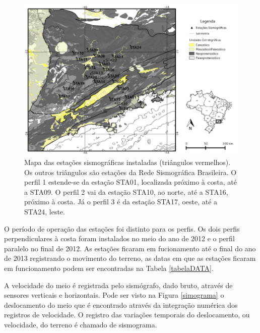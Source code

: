 \begin{figure}[!ht]
\centering
\includegraphics[scale=0.5]{Figs/mapa_das_estacoes_simosgraficas_instaladas.png}
\caption[Mapa das estações sismográficas instaladas]{Mapa das estações sismográficas instaladas (triângulos vermelhos). Os outros triângulos são estações da Rede Sismográfica Brasileira. O perfil 1 estende-se da estação STA01, localizada próximo à costa, até a STA09. O perfil 2 vai da estação STA10, ao norte, até a STA16, próximo à costa. Já o perfil 3 é da estação STA17, oeste, até a STA24, leste.}
\label{map_loc}
\end{figure}

O período de operação das estações foi distinto para os perfis. Os dois perfis perpendiculares à costa foram instalados no meio do ano de 2012 e o perfil paralelo no final de 2012. As estações ficaram em fucionamento até o final do ano de 2013 registrando o movimento do terreno, as datas em que as estações ficaram em funcionamento podem ser encontradas na Tabela \ref{tabelaDATA}. 

A velocidade do meio é registrada pelo sismógrafo, dado bruto, através de sensores verticais e horizontais. Pode ser visto na Figura \ref{simograma} o deslocamento do meio que é encontrado através da integração numérica dos registros de velocidade. O registro das variações temporais do deslocamento, ou velocidade, do terreno é chamado de sismograma. 

